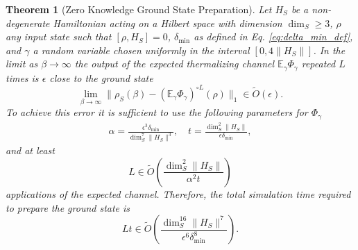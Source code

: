\documentclass{article}
\newtheorem{theorem}{Theorem}
\newcommand{\norm}[1]{\| #1 \|}
\newcommand{\EE}{\mathbb{E}}
\begin{document}
\begin{theorem}[Zero Knowledge Ground State Preparation] \label{thm:ground_state}
    Let $H_S$ be a non-degenerate Hamiltonian acting on a Hilbert space with dimension $\dim_S \ge 3$, $\rho$ any input state such that $[\rho, H_S] = 0$, $\delta_{\min}$ as defined in Eq. \eqref{eq:delta_min_def}, and $\gamma$ a random variable chosen uniformly in the interval $[0, 4 \norm{H_S}]$. In the limit as $\beta \to \infty$ the output of the expected thermalizing channel $\EE_\gamma \Phi_\gamma$ repeated $L$ times is $\epsilon$ close to the ground state
    \begin{equation}
        \lim_{\beta \to \infty} \norm{\rho_S(\beta) - (\EE_\gamma \Phi_\gamma)^{\circ L} (\rho)}_1 \in \widetilde{O}(\epsilon).
    \end{equation}
    To achieve this error it is sufficient to use the following parameters for $\Phi_{\gamma}$
    \begin{align}
        \alpha = \frac{\epsilon^3 \delta_{\min}}{\dim_S^7 \norm{H_S}^3 }, \quad t = \frac{\dim_S^2 \norm{H_S}}{\epsilon \delta_{\min}},
    \end{align}
    and at least 
    \begin{equation}
        L \in \widetilde{O} \left( \frac{\dim_S^2 \norm{H_S}}{\alpha^2 t}\right)
    \end{equation}
    applications of the expected channel.
    Therefore, the total simulation time required to prepare the ground state is
    \begin{equation}
        Lt \in \widetilde{O}\left( \frac{\dim_S^{16} \norm{H_S}^7}{\epsilon^{6} \delta_{\min}^8} \right).
    \end{equation}
\end{theorem}
\end{document}

